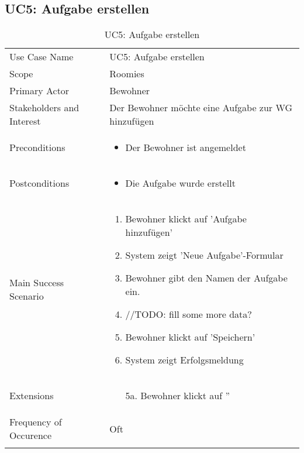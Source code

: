 \subsection{UC5: Aufgabe erstellen}
\begin{table}[H]
	\tablestyle
	\tablealtcolored
	\begin{tabularx}{\textwidth}{lX}
		\tablebody
			Use Case Name &
			UC5: Aufgabe erstellen
			\tabularnewline
			Scope &
			Roomies
			\tabularnewline
			Primary Actor &
			Bewohner
			\tabularnewline
			Stakeholders and Interest &
			Der Bewohner möchte eine Aufgabe zur WG hinzufügen
			\tabularnewline
			Preconditions &
			\begin{itemize}
				\item Der Bewohner ist angemeldet
			\end{itemize}
			\tabularnewline
			Postconditions &
			\begin{itemize}
				\item Die Aufgabe wurde erstellt
			\end{itemize}
			\tabularnewline
			Main Success Scenario &
			\begin{enumerate}
				\item Bewohner klickt auf 'Aufgabe hinzufügen'
				\item System zeigt 'Neue Aufgabe'-Formular
				\item Bewohner gibt den Namen der Aufgabe ein.
				\item //TODO: fill some more data?
				\item Bewohner klickt auf 'Speichern'
				\item System zeigt Erfolgsmeldung
			\end{enumerate}
			\tabularnewline
			Extensions &
			\begin{itemize}
				\item[5a.] Bewohner klickt auf ''
			\end{itemize}
			\tabularnewline
			Frequency of Occurence &
			Oft
			\tabularnewline
		\tableend
	\end{tabularx}
	\caption{UC5: Aufgabe erstellen}
\end{table}


